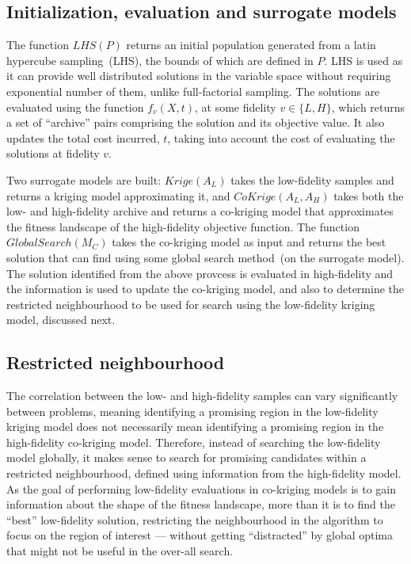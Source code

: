 \subsection{Initialization, evaluation and surrogate models}
The function $LHS(P)$ returns an initial population generated from a latin hypercube sampling~(LHS), the bounds of which are defined in $P$. LHS is used as it can provide well distributed solutions in the variable space without requiring exponential number of them, unlike full-factorial sampling. The solutions are evaluated using the function $f_v(X,t)$, at some fidelity $v\in \{L,H\}$, which returns a set of ``archive'' pairs comprising the solution and its objective value. It also updates the total cost incurred, $t$, taking into account the cost of evaluating the solutions at fidelity $v$. 

Two surrogate models are built: $Krige(A_L)$ takes the low-fidelity samples and returns a kriging model approximating it, and $CoKrige(A_L,A_H)$ takes both the low- and high-fidelity archive and returns a co-kriging model that approximates the fitness landscape of the high-fidelity objective function. The function $GlobalSearch(M_C)$ takes the co-kriging model as input and returns the best solution that can find using some global search method~(on the surrogate model). The solution identified from the above provcess is evaluated in high-fidelity and the information is used to update the co-kriging model, and also to determine the restricted neighbourhood to be used for search using the low-fidelity kriging model, discussed next.

\subsection{Restricted neighbourhood}\label{subsec:restrict}
The correlation between the low- and high-fidelity samples can vary significantly between problems, meaning identifying a promising region in the low-fidelity kriging model does not necessarily mean identifying a promising region in the high-fidelity co-kriging model. Therefore, instead of searching the low-fidelity model globally, it makes sense to search for promising candidates within a restricted neighbourhood, defined using information from the high-fidelity model. As the goal of performing low-fidelity evaluations in co-kriging models is to gain information about the shape of the fitness landscape, more than it is to find the ``best'' low-fidelity solution, restricting the neighbourhood in the algorithm to focus on the region of interest --- without getting ``distracted'' by global optima that might not be useful in the over-all search.

